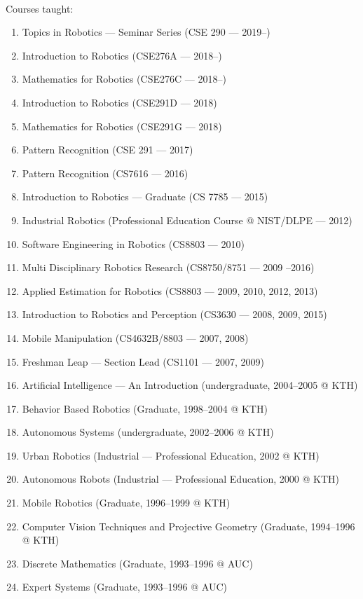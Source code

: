 \documentclass{article}
\begin{document}
\begin{cv}
\begin{cvlist}{~}
\item[Courses taught:]
  \begin{enumerate}
  \item Topics in Robotics --- Seminar Series (CSE 290 --- 2019--)
  \item Introduction to Robotics (CSE276A --- 2018--)
  \item Mathematics for Robotics (CSE276C --- 2018--)
  \item Introduction to Robotics (CSE291D --- 2018)
  \item Mathematics for Robotics (CSE291G --- 2018)
  \item Pattern Recognition (CSE 291 --- 2017)
  \item Pattern Recognition (CS7616 --- 2016)
  \item Introduction to Robotics --- Graduate (CS 7785 --- 2015)
  \item Industrial Robotics (Professional Education Course @ NIST/DLPE
          --- 2012)
  \item Software Engineering in Robotics (CS8803 --- 2010)
  \item Multi Disciplinary Robotics Research (CS8750/8751 --- 2009 --2016)
  \item Applied Estimation for Robotics (CS8803 --- 2009, 2010, 2012, 2013)
  \item Introduction to Robotics and Perception (CS3630 --- 2008, 2009, 2015)
  \item Mobile Manipulation (CS4632B/8803 --- 2007, 2008)
  \item Freshman Leap --- Section Lead (CS1101 --- 2007, 2009)
  \item Artificial Intelligence --- An Introduction (undergraduate,
    2004--2005 @ KTH)
  \item Behavior Based Robotics (Graduate, 1998--2004 @ KTH)
  \item Autonomous Systems (undergraduate, 2002--2006 @ KTH)
  \item Urban Robotics (Industrial --- Professional Education, 2002 @ KTH)
  \item Autonomous Robots (Industrial --- Professional Education, 2000 @  KTH)
  \item Mobile Robotics (Graduate, 1996--1999 @ KTH)
  \item Computer Vision Techniques and Projective Geometry (Graduate,
    1994--1996 @ KTH)
  \item Discrete Mathematics (Graduate, 1993--1996 @ AUC)
  \item Expert Systems (Graduate, 1993--1996 @ AUC)

\end{enumerate}
\end{cvlist}
\end{cv}
\end{document}
